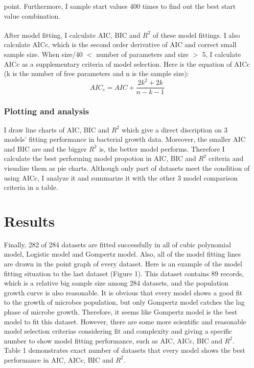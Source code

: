 \documentclass[11pt]{article}
\begin{document}
      point. Furthermore, I sample start values 400 times to find out the best start value combination.\\
      \\
      After model fitting, I calculate AIC, BIC and $R^2$ of these model fittings. I also calculate AICc, 
      which is the second order derivative of AIC and correct small sample size. When size/40 $<$ number 
      of parameters and size $>$ 5, I calculate AICc as a supplementary criteria of model selection. Here is the 
      equation of AICc (k is the number of free parameters and n is the sample size):
      \begin{equation}
        \ AIC_{c} = AIC + \frac{2k^{2} + 2k}{n - k - 1}\
      \end{equation}

    \subsubsection{Plotting and analysis}
      I draw line charts of AIC, BIC and $R^2$ which give a direct discription on 3 models' fitting performance 
      in bacterial growth data. Moreover, the smaller AIC and BIC are and the bigger $R^2$ is, the better 
      model performs. Therefore I calculate the best performing model propotion in AIC, BIC and $R^2$ criteria 
      and visualize them as pie charts. Although only part of datasets meet the condition of using AICc, I analyze 
      it and summarize it with the other 3 model comparison criteria in a table.

  
  \section{Results}
    Finally, 282 of 284 datasets are fitted successfully in all of cubic polynomial model, Logistic model 
    and Gompertz model. Also, all of the model fitting lines are drawn in the point graph of every dataset. 
    Here is an example of the model fitting situation to the last dataset (Figure 1). This dataset contains 
    89 records, which is a relative big sample size among 284 datasets, and the population growth curve is also 
    reasonable. It is obvious that every model shows a good fit to the growth of microbes population, but 
    only Gompertz model catches the lag phase of microbe growth. Therefore, it seems like Gompertz model is 
    the best model to fit this dataset. However, there are some more scientific and reasonable model selection 
    criterias considering fit and complexity and giving a specific number to show model fitting performance, 
    such as AIC, AICc, BIC and $R^2$. Table 1 demonstrates exact number of datasets that every model shows 
    the best performance in AIC, AICc, BIC and $R^2$.
  
\end{document}
